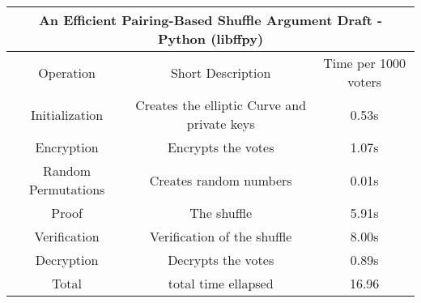 \documentclass{standalone}
\begin{document}
\begin{tabular}{ |c|c|c|  }
    \hline
    \multicolumn{3}{|c|}{An Efficient Pairing-Based Shuffle Argument Draft -
    Python (libffpy)}\\
    \hline
    Operation & Short Description & Time per 1000 voters\\
    \hline
    Initialization & Creates the elliptic Curve and private keys & 0.53s\\
    Encryption & Encrypts the votes & 1.07s\\
    Random Permutations & Creates random numbers & 0.01s\\
    Proof & The shuffle & 5.91s\\
    Verification & Verification of the shuffle & 8.00s\\
    Decryption & Decrypts the votes & 0.89s\\
    Total & total time ellapsed & 16.96\\
    \hline
\end{tabular}
\end{document}
